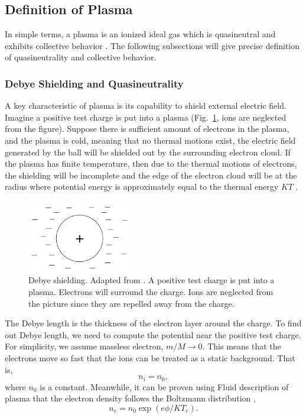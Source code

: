 \subsection{Definition of Plasma}
In simple terms, a plasma is an ionized ideal gas which is quasineutral and exhibits collective behavior \cite{chen_introduction_2016}. The following subsections will give precise definition of quasineutrality and collective behavior.

\subsubsection*{Debye Shielding and Quasineutrality}
A key characteristic of plasma is its capability to shield external electric field. Imagine a positive test charge is put into a plasma (Fig.~\ref{fig:debye-shielding}, ions are neglected from the figure). Suppose there is sufficient amount of electrons in the plasma, and the plasma is cold, meaning that no thermal motions exist, the electric field generated by the ball will be shielded out by the surrounding electron cloud. If the plasma has finite temperature, then due to the thermal motions of electrons, the shielding will be incomplete and the edge of the electron cloud will be at the radius where potential energy is approximately equal to the thermal energy $KT$ \cite{chen_introduction_2016}.

\begin{figure}[htbp]
	\centering
	\includegraphics[width=0.4\textwidth]{figures/debye-shielding.png}
	\caption{Debye shielding. Adapted from \cite{chen_introduction_2016}. A positive test charge is put into a plasma. Electrons will surround the charge. Ions are neglected from the picture since they are repelled away from the charge.}
	\label{fig:debye-shielding}
\end{figure}

The Debye length is the thickness of the electron layer around the charge. To find out Debye length, we need to compute the potential near the positive test charge. For simplicity, we assume massless electron, $m/M \to 0$. This means that the electrons move so fast that the ions can be treated as a static background. That is,
\begin{equation}
	n_i = n_0,
	\label{eq:ion-density-static-background}
\end{equation}
where $n_0$ is a constant. Meanwhile, it can be proven using Fluid description of plasma that the electron density follows the Boltzmann distribution \cite{chen_introduction_2016},
\begin{equation}
	n_e = n_0\exp(e\phi/KT_e).
	\label{eq:electron-density-boltzmann}
\end{equation}


